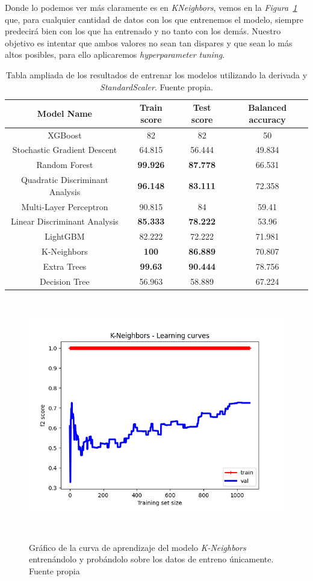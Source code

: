 Donde lo podemos ver más claramente es en \textit{KNeighbors}, vemos en la \textit{Figura\ \ref{fig:lc-knn}} que, para cualquier cantidad de datos con los que entrenemos el modelo, siempre predecirá bien con los que ha entrenado y no tanto con los demás. Nuestro objetivo es intentar que ambos valores no sean tan dispares y que sean lo más altos posibles, para ello aplicaremos \textit{hyperparameter tuning}.

\begin{table}[!ht]
    \centering
    \begin{tabular}{|c|ccc|}
    \hline
        Model Name & Train score & Test score & Balanced accuracy \\ \hline
        XGBoost & 82 & 82 & 50 \\ 
        Stochastic Gradient Descent & 64.815 & 56.444 & 49.834 \\ 
        Random Forest & \textbf{99.926} & \textbf{87.778} & 66.531 \\ 
        Quadratic Discriminant Analysis & \textbf{96.148} & \textbf{83.111} & 72.358 \\ 
        Multi-Layer Perceptron & 90.815 & 84 & 59.41 \\ 
        Linear Discriminant Analysis & \textbf{85.333} & \textbf{78.222} & 53.96 \\ 
        LightGBM & 82.222 & 72.222 & 71.981 \\ 
        K-Neighbors & \textbf{100} & \textbf{86.889} & 70.807 \\ 
        Extra Trees & \textbf{99.63} & \textbf{90.444} & 78.756 \\ 
        Decision Tree & 56.963 & 58.889 & 67.224 \\
    \hline
    \end{tabular}
    \caption{Tabla ampliada de los resultados de entrenar los modelos utilizando la derivada y \textit{StandardScaler}. Fuente propia.}\ \label{tab:final-training-results}
\end{table}

\begin{figure}[!h]
    \centering
    \includegraphics[width=0.7\linewidth]{media/images/learing-curves-knn.png}
    \caption{Gráfico de la curva de aprendizaje del modelo \textit{K-Neighbors} entrenándolo y probándolo sobre los datos de entreno únicamente. Fuente propia}\ \label{fig:lc-knn}
\end{figure}

